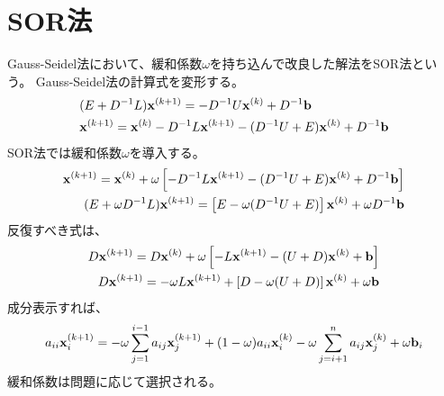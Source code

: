 \documentclass{jsarticle}
\newcommand{\kakko}[1][]{(#1)}
\newcommand{\bx}{\bold{x}}
\newcommand{\bb}{\bold{b}}
\begin{document}
\section{SOR法}
Gauss-Seidel法において、緩和係数$\omega$を持ち込んで改良した解法をSOR法という。
Gauss-Seidel法の計算式を変形する。
\begin{align}
&    (E + D^{-1}L)\bx^{\kakko[k+1]} = - D^{-1} U \bx^{\kakko[k]} + D^{-1}\bold{b}\\
&    \bx^{\kakko[k+1]} = \bx^{\kakko[k]}-D^{-1}L\bx^{\kakko[k+1]}- (D^{-1} U+E) \bx^{\kakko[k]} + D^{-1}\bold{b}
\end{align}
SOR法では緩和係数$\omega$を導入する。
\begin{align}
  \bx^{\kakko[k+1]} = \bx^{\kakko[k]} +\omega\left[-D^{-1}L\bx^{\kakko[k+1]}- (D^{-1} U+E) \bx^{\kakko[k]} + D^{-1}\bb \right]\\
  (E + \omega D^{-1}L)\bx^{\kakko[k+1]} = \left[E-\omega(D^{-1} U+E)\right] \bx^{\kakko[k]} + \omega D^{-1}\bb 
\end{align}
反復すべき式は、
\begin{align}
  D\bx^{\kakko[k+1]} = D\bx^{\kakko[k]} +\omega\left[-L\bx^{\kakko[k+1]}- (U+D) \bx^{\kakko[k]} + \bb \right]\\
  D\bx^{\kakko[k+1]} = - \omega L\bx^{\kakko[k+1]} +\left[D- \omega (U+D)\right] \bx^{\kakko[k]} + \omega\bb 
\end{align}
成分表示すれば、
\begin{equation}
a_{ii}\bx^{\kakko[k+1]}_i = - \omega\sum^{i-1}_{j=1} a_{ij}\bx^{\kakko[k+1]}_j + (1- \omega) a_{ii}\bx^{\kakko[k]}_i -\omega\sum^{n}_{j=i+1}a_{ij}\bx^{\kakko[k]}_j+\omega\bb_i
\end{equation}
緩和係数は問題に応じて選択される。
\end{document}
